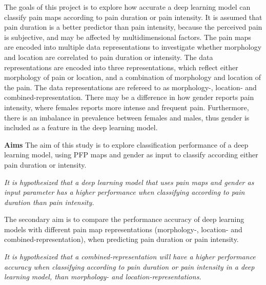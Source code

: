 \noindent
The goals of this project is to explore how accurate a deep learning model can classify pain maps according to pain duration or pain intensity. It is assumed that pain duration is a better predictor than pain intensity, because the perceived pain is subjective, and may be affected by multidimensional factors. 
The pain maps are encoded into multiple data representations to investigate whether morphology and location are correlated to pain duration or intensity.\newline
\noindent
The data representations are encoded into three representations, which reflect either morphology of pain or location, and a combination of morphology and location of the pain. The data representations are refereed to as morphology-, location- and combined-representation.
There may be a difference in how gender reports pain intensity, where females reports more intense and frequent pain. Furthermore, there is an imbalance in prevalence between females and males, thus gender is included as a feature in the deep learning model. \newline

\noindent
\textbf{Aims}\newline
\noindent
The aim of this study is to explore classification performance of a deep learning model, using PFP maps and gender as input to classify according either pain duration or intensity.


\begin{center}
\textit{It is hypothesized that a deep learning model that uses pain maps and gender as input parameter has a higher performance when classifying according to pain duration than pain intensity.}
\end{center}
\newpage
\noindent
The secondary aim is to compare the performance accuracy of deep learning models with different pain map representations (morphology-, location- and combined-representation), when predicting pain duration or pain intensity.
\begin{center}
\textit{It is hypothesized that a combined-representation will have a higher performance accuracy when classifying according to pain duration or pain intensity in a deep learning model, than morphology- and location-representations.}
\end{center}
